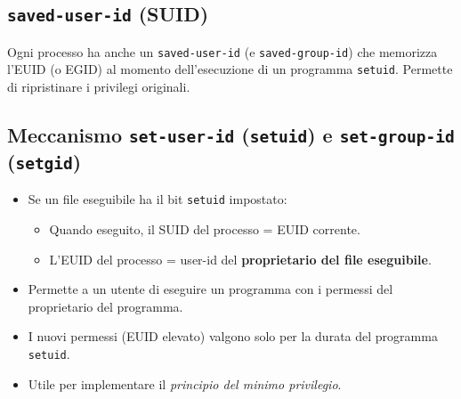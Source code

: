 \subsection{\texttt{saved-user-id} (SUID)}
Ogni processo ha anche un \texttt{saved-user-id} (e \texttt{saved-group-id}) che memorizza l'EUID (o EGID) al momento dell'esecuzione di un programma \texttt{setuid}. Permette di ripristinare i privilegi originali.

\subsection{Meccanismo \texttt{set-user-id} (\texttt{setuid}) e \texttt{set-group-id} (\texttt{setgid})}
\begin{itemize}
    \item Se un file eseguibile ha il bit \texttt{setuid} impostato:
    \begin{itemize}
        \item Quando eseguito, il SUID del processo = EUID corrente.
        \item L'EUID del processo = user-id del \textbf{proprietario del file eseguibile}.
    \end{itemize}
    \item Permette a un utente di eseguire un programma con i permessi del proprietario del programma.
    \item I nuovi permessi (EUID elevato) valgono solo per la durata del programma \texttt{setuid}.
    \item Utile per implementare il \textit{principio del minimo privilegio}.
\end{itemize}

